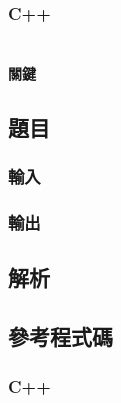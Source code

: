 \documentclass[a4paper,10pt]{article}
\begin{document}
\subsubsection{C++}




% 

\section{}

\paragraph{關鍵}

\subsection{題目}



\subsubsection{輸入}



\subsubsection{輸出}



\subsection{解析}



\subsection{參考程式碼}

\subsubsection{C++}

%


% 
\end{document}

